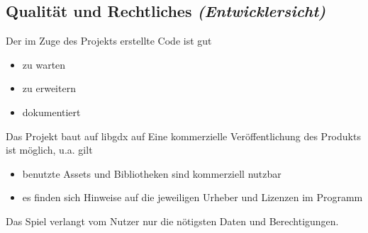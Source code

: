 \subsection{Qualität und Rechtliches \textit{(Entwicklersicht)}}
\begin{requirements}
	 Der im Zuge des Projekts erstellte Code ist gut
		\begin{itemize}
			\item zu warten
			\item zu erweitern
			\item dokumentiert
		\end{itemize}
	 Das Projekt baut auf libgdx auf
	 Eine kommerzielle Veröffentlichung des Produkts ist möglich, u.a. gilt
		\begin{itemize}
			\item benutzte Assets und Bibliotheken sind kommerziell nutzbar
			\item es finden sich Hinweise auf die jeweiligen Urheber und Lizenzen im Programm
		\end{itemize}
	 Das Spiel verlangt vom Nutzer nur die nötigsten Daten und Berechtigungen.
\end{requirements}
